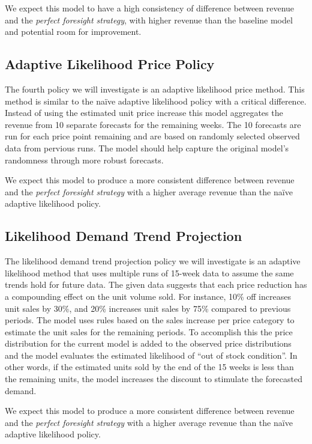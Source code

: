 \documentclass[11pt,a4paper]{article}
\begin{document}
We expect this model to have a high consistency of difference between revenue and the \emph{perfect foresight strategy}, with higher revenue than the baseline model and potential room for improvement.

\subsection{Adaptive Likelihood Price Policy}
The fourth policy we will investigate is an adaptive likelihood price method. 
This method is similar to the naïve adaptive likelihood policy with a critical difference. 
Instead of using the estimated unit price increase this model aggregates the revenue from 10 separate forecasts for the remaining weeks. 
The 10 forecasts are run for each price point remaining and are based on randomly selected observed data from pervious runs.  
The model should help capture the original model’s randomness through more robust forecasts. 

We expect this model to produce a more consistent difference between revenue and the \emph{perfect foresight strategy} with a higher average revenue than the naïve adaptive likelihood policy.

\subsection{Likelihood Demand Trend Projection}
The likelihood demand trend projection policy we will investigate is an adaptive likelihood method that uses multiple runs of 15-week data to assume the same trends hold for future data. 
The given data suggests that each price reduction has a compounding effect on the unit volume sold. 
For instance, 10\% off increases unit sales by 30\%, and 20\% increases unit sales by 75\% compared to previous periods. 
The model uses rules based on the sales increase per price category to estimate the unit sales for the remaining periods. 
To accomplish this the price distribution for the current model is added to the observed price distributions and the model evaluates the estimated likelihood of “out of stock condition”. 
In other words, if the estimated units sold by the end of the 15 weeks is less than the remaining units, the model increases the discount to stimulate the forecasted demand. 

We expect this model to produce a more consistent difference between revenue and the \emph{perfect foresight strategy} with a higher average revenue than the naïve adaptive likelihood policy.
\end{document}
